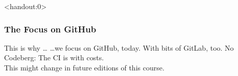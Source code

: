 \begin{frame}<handout:0>
	\frametitle{The Focus on GitHub}
	\begin{block}{This is why \ldots}
				\ldots we focus on GitHub, today. With bits of GitLab, too.\newline
		No Codeberg: The CI is with costs.\\
		This might change in future editions of this course.
	\end{block}
\end{frame}
	